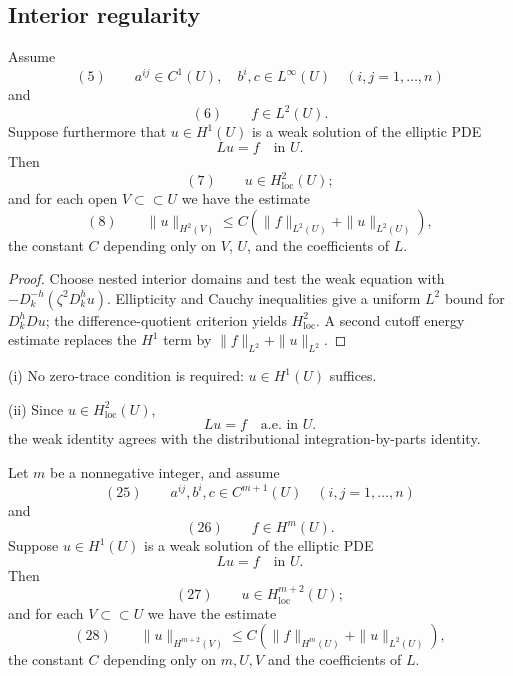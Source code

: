 \subsection{Interior regularity}

\begin{theorem}
\label{thm:interior-h2-regularity}

Assume
$$(5) \qquad a^{ij} \in C^1(U), \quad b^i,c \in L^\infty(U) \quad (i,j=1,\ldots,n)$$
and
$$(6) \qquad f \in L^2(U).$$
Suppose furthermore that $u \in H^1(U)$ is a weak solution of the elliptic PDE
$$Lu = f \quad \text{in } U.$$
Then
$$(7) \qquad u \in H^2_{\text{loc}}(U);$$
and for each open $V \subset\subset U$ we have the estimate
$$(8) \qquad \|u\|_{H^2(V)} \leq C\left(\|f\|_{L^2(U)} + \|u\|_{L^2(U)}\right),$$
the constant $C$ depending only on $V$, $U$, and the coefficients of $L$.
\end{theorem}

\begin{proof}
\sketch Choose nested interior domains and test the weak equation with $-D_k^{-h}(\zeta^2D_k^hu)$. Ellipticity and Cauchy inequalities give a uniform $L^2$ bound for $D_k^hDu$; the difference-quotient criterion yields $H^2_{\mathrm{loc}}$. A second cutoff energy estimate replaces the $H^1$ term by $\|f\|_{L^2}+\|u\|_{L^2}$.
\end{proof}

\begin{remark}
\label{rem:interior-regularity-remarks}

(i) No zero-trace condition is required: $u\in H^1(U)$ suffices.

(ii) Since $u\in H^2_{\mathrm{loc}}(U)$,
$$Lu = f \quad \text{a.e. in } U.$$
the weak identity agrees with the distributional integration-by-parts identity.
\end{remark}

\begin{theorem}
\label{thm:higher-interior-regularity}

Let $m$ be a nonnegative integer, and assume
$$(25) \qquad a^{ij}, b^i, c \in C^{m+1}(U) \quad (i,j=1,\ldots,n)$$
and
$$(26) \qquad f \in H^m(U).$$
Suppose $u \in H^1(U)$ is a weak solution of the elliptic PDE
$$Lu = f \quad \text{in } U.$$
Then
$$(27) \qquad u \in H^{m+2}_{\text{loc}}(U);$$
and for each $V \subset\subset U$ we have the estimate
$$(28) \qquad \|u\|_{H^{m+2}(V)} \leq C(\|f\|_{H^m(U)} + \|u\|_{L^2(U)}),$$
the constant $C$ depending only on $m, U, V$ and the coefficients of $L$.
\end{theorem}

